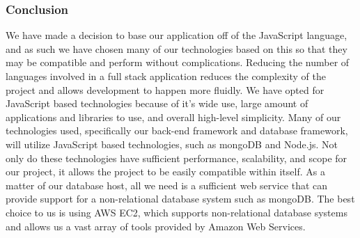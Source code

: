 \subsubsection{Conclusion}

	We have made a decision to base our application off of the JavaScript language, and as such we have chosen many of our technologies based on this
	so that they may be compatible and perform without complications. Reducing the number of languages involved in a full stack application reduces the complexity of
	the project and allows development to happen more fluidly. We have opted for JavaScript based technologies because of it's wide use, large amount of
	applications and libraries to use, and overall high-level simplicity. Many of our technologies used, specifically our back-end framework and database framework, 
	will utilize JavaScript based technologies, such as mongoDB and Node.js. Not only do these technologies have sufficient performance, scalability, and scope for our project, it allows the 
	project to be easily compatible within itself. As a matter of our database host, all we need is a sufficient web service that can provide support for a 
	non-relational database system such as mongoDB. The best choice to us is using AWS EC2, which supports non-relational database systems 
	and allows us a vast array of tools provided by Amazon Web Services. 


	







